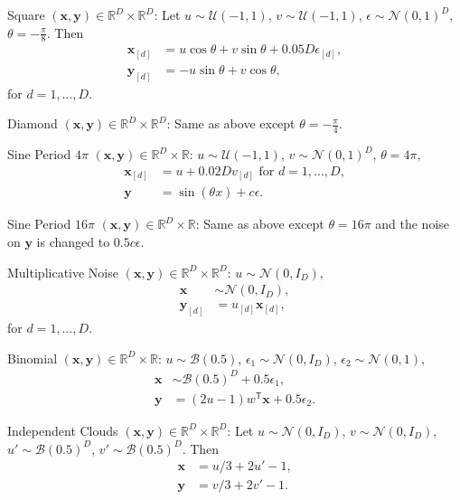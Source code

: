 \documentclass[11pt]{article}
\providecommand{\mb}[1]{\boldsymbol{#1}}
\providecommand{\mc}[1]{\mathcal{#1}}
\newcommand{\Real}{\mathbb{R}}
\newcommand{\T}{^{\ensuremath{\mathsf{T}}}}           %
\begin{document}
\begin{compactenum}
\item Square $(\mb{x},\mb{y}) \in \Real^{D} \times \Real^{D}$: Let $u \sim \mc{U}(-1,1)$, $v \sim \mc{U}(-1,1)$, $\epsilon \sim \mc{N}(0,1)^{D}$, $\theta=-\frac{\pi}{8}$. Then
\begin{align*}
\mb{x}_{[d]}&=u \cos\theta + v \sin\theta + 0.05 D\epsilon_{[d]},\\
\mb{y}_{[d]}&=-u \sin\theta + v \cos\theta,
\end{align*}
for $d=1,\ldots,D$.
\item Diamond $(\mb{x},\mb{y}) \in \Real^{D} \times \Real^{D}$: Same as above except $\theta=-\frac{\pi}{4}$.
\item Sine Period $4\pi$ $(\mb{x},\mb{y}) \in \Real^{D} \times \Real$: $u \sim \mc{U}(-1,1)$, $v \sim \mc{N}(0,1)^{D}$, $\theta=4\pi$,
\begin{align*}
\mb{x}_{[d]}&=u+0.02 D v_{[d]} \mbox{ for $d=1,\ldots,D$}, \\
\mb{y}&=\sin ( \theta x )+c\epsilon.
\end{align*}
\item Sine Period $16\pi$ $(\mb{x},\mb{y}) \in \Real^{D} \times \Real$: Same as above except $\theta=16\pi$ and the noise on $\mb{y}$ is changed to $0.5c\epsilon$.
\item Multiplicative Noise $(\mb{x},\mb{y}) \in \Real^{D} \times \Real^{D}$: $u \sim \mc{N}(0, I_{D})$, %
\begin{align*}
\mb{x} &\sim \mc{N}(0, I_{D}),\\
\mb{y}_{[d]}&=u_{[d]}\mb{x}_{[d]},%
\end{align*}
for $d=1,\ldots,D$.
\item Binomial $(\mb{x},\mb{y}) \in \Real^{D} \times \Real$: $u \sim \mc{B}(0.5)$, $\epsilon_{1} \sim \mc{N}(0, I_{D})$, $\epsilon_{2} \sim \mc{N}(0, 1)$,
\begin{align*}
\mb{x} &\sim \mc{B}(0.5)^{D}+0.5\epsilon_{1},\\
\mb{y}&=(2u-1)w\T \mb{x}+0.5\epsilon_{2}.
\end{align*}
\item Independent Clouds $(\mb{x},\mb{y}) \in \Real^{D} \times \Real^{D}$: Let $u \sim \mc{N}(0,I_{D})$, $v \sim \mc{N}(0,I_{D})$, $u' \sim \mc{B}(0.5)^{D}$, $v' \sim \mc{B}(0.5)^{D}$. Then
\begin{align*}
\mb{x}&=u/3+2u'-1,\\
\mb{y}&=v/3+2v'-1.
\end{align*}
\end{compactenum}
\end{document}
